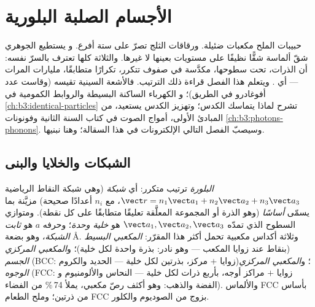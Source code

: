 \chapter{الأجسام الصلبة البلورية}\label{ch:b3:crystalline-solids}


حبيبات الملح مكعبات ضئيلة. ورقاقات الثلج تصرّ على ستة أفرع. و
يستطيع الجوهري شقّ ألماسة شقًّا نظيفًا على مستويات بعينها لا
غيرها. والثلاثة كلها تعترف بالسرّ نفسه: أن الذرات، تحت سطوحها،
مكدَّسة في صفوف تتكرر، تكرارًا متطابقًا، مليارات
المرات --- أي \emph{}. ويتعلم هذا الفصل قراءة ذلك
الترتيب. فالأشعة السينية تقيسه (وقاست عدد أفوغادرو في الطريق)؛ و
الكهرباء الساكنة البسيطة والروابط الكمومية في
\cref{ch:b3:identical-particles} تشرح لماذا يتماسك
الكدس؛ وتهزيز الكدس يستعيد، من المبادئ
الأولى، أمواج الصوت في كتاب السنة الثانية وفونونات
\cref{ch:b3:photons-phonons}. وسيصبّ الفصل التالي الإلكترونات
في هذا السقالة؛ وهنا نبنيها.

\section{الشبكات والخلايا والبنى}

\begin{definition}\label{def:b3:crystalline-solids:lattice}
\emph{البلورة} ترتيب متكرر: أي \emph{شبكة} (وهي
شبكة النقاط الرياضية $\vect r = n_1\vect a_1 + n_2\vect a_2
+ n_3\vect a_3$، مع $n_i$ أعدادًا صحيحة) مزيَّنة بما يسمّى \emph{أساسًا} (وهو
الذرة أو المجموعة المعلَّقة تعليقًا متطابقًا على كل نقطة). ومتوازي السطوح
الذي تمدّه $\vect a_1, \vect a_2, \vect a_3$ هو \emph{خلية وحدة}؛
وحرفه $a$ هو \emph{ثابت الشبكة}، وهو بضعة
\unit{\angstrom}. وثلاثة أكداس مكعبية تحمل أكثر هذا المقرّر:
\emph{المكعبي البسيط} (بنقاط عند زوايا المكعب --- وهو نادر: بذرة واحدة لكل
خلية)؛ و\emph{المكعبي المركزي الجسم} (BCC: زوايا $+$ مركز، بذرتين
لكل خلية --- الحديد والكروم)؛ و\emph{المكعبي المركزي الوجوه} (FCC:
زوايا $+$ مراكز أوجه، بأربع ذرات لكل خلية --- النحاس والألومنيوم و
الفضة والذهب: وهو أكثف رصّ مكعبي، يملأ 74\,\% من الفضاء).
والألماس FCC بأساس من ذرتين؛ وملح الطعام FCC بزوج من الصوديوم
والكلور.
\end{definition}


